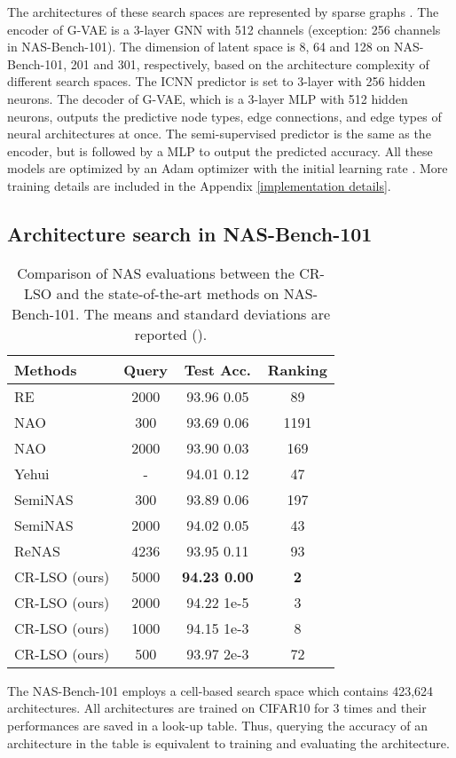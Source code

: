 \documentclass[10pt,twocolumn,letterpaper]{article}
\begin{document}
The architectures of these search spaces are represented by sparse graphs \cite{fey2019fast}. The encoder of G-VAE is a 3-layer GNN with 512 channels (exception: 256 channels in NAS-Bench-101). The dimension of latent space is 8, 64 and 128 on NAS-Bench-101, 201 and 301, respectively, based on the architecture complexity of different search spaces. The ICNN predictor is set to 3-layer with 256 hidden neurons. The decoder of G-VAE, which is a 3-layer MLP with 512 hidden neurons, outputs the predictive node types, edge connections, and edge types of neural architectures at once. The semi-supervised predictor is the same as the encoder, but is followed by a MLP to output the predicted accuracy. All these models are optimized by an Adam optimizer with the initial learning rate . More training details are included in the Appendix \ref{implementation details}. 
\subsection{Architecture search in NAS-Bench-101}
\begin{table}[htbp]
	\centering
	\caption{Comparison of NAS evaluations between the CR-LSO and the state-of-the-art methods on NAS-Bench-101. The means and standard deviations are reported (). }
	\begin{tabular}{lccc}
		\toprule
		Methods & Query & Test Acc. & Ranking \\
		\midrule
		RE \cite{real2019regularized} & 2000 & 93.96  0.05 & 89 \\
		NAO \cite{luo2018neural} & 300 & 93.69  0.06 & 1191 \\
		NAO \cite{luo2018neural} & 2000 & 93.90  0.03 & 169 \\
		Yehui  \cite{DBLP:conf/cvpr/TangWXCSXX0X20}  & - & 94.01  0.12 & 47 \\
		SemiNAS \cite{DBLP:conf/nips/Luo0WQCL20} & 300 & 93.89  0.06 & 197 \\
		SemiNAS \cite{DBLP:conf/nips/Luo0WQCL20} & 2000 & 94.02  0.05 & 43 \\
		ReNAS \cite{DBLP:conf/cvpr/Xu00TJX021} & 4236 & 93.95  0.11 & 93 \\ 
		\midrule
		CR-LSO (ours) & 5000 & \textbf{94.23  0.00} & \textbf{2} \\ 
		CR-LSO (ours) & 2000 & 94.22  1e-5 & 3 \\ 
		CR-LSO (ours) & 1000 & 94.15  1e-3 & 8\\
		CR-LSO (ours) & 500 & 93.97  2e-3 & 72 \\ 
		\bottomrule
	\end{tabular}
	\label{tab:nas_ben_101}
\end{table}
The NAS-Bench-101 employs a cell-based search space which contains 423,624 architectures. All architectures are trained on CIFAR10 for 3 times and their performances are saved in a look-up table. Thus, querying the accuracy of an architecture in the table is equivalent to training and evaluating the architecture. 
\end{document}
